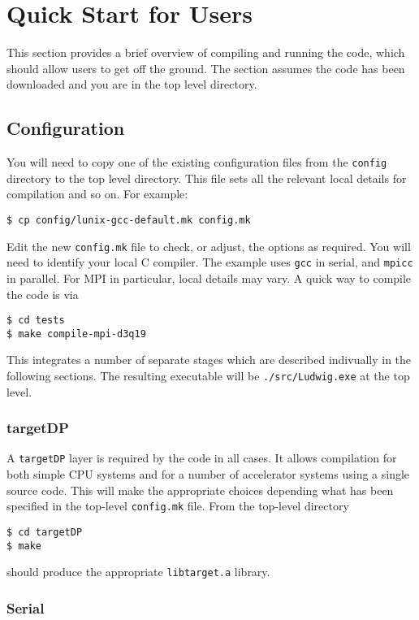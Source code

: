 \vfill
\pagebreak

\section{Quick Start for Users}

This section provides a brief overview of compiling and running
the code, which should allow users to get off the ground.
The section assumes the code has been downloaded and you are in the
top level directory.

\subsection{Configuration}

You will need to copy one of the existing configuration files from
the \texttt{config} directory to the top level directory. This file
sets all the relevant local details for compilation and so on. For
example:
\begin{lstlisting}
$ cp config/lunix-gcc-default.mk config.mk
\end{lstlisting}
Edit the new \texttt{config.mk} file to check, or adjust, the options
as required. You will need to identify your local C compiler. The
example uses \texttt{gcc}
in serial, and \texttt{mpicc} in parallel. For MPI in particular,
local details may vary. A quick way to compile the code is via
\begin{lstlisting}
$ cd tests
$ make compile-mpi-d3q19
\end{lstlisting}
This integrates a number of separate stages which are described
indivually in the following sections. The resulting executable
will be \texttt{./src/Ludwig.exe} at the top level.

\subsubsection{targetDP}

A \texttt{targetDP} layer is required by the code in all cases. It
allows compilation for both simple CPU systems and
for a number of accelerator systems using a single source code. This
will make the appropriate choices depending what has been specified
in the top-level \texttt{config.mk} file. From the top-level directory
\begin{lstlisting}
$ cd targetDP
$ make
\end{lstlisting}
should produce the appropriate \texttt{libtarget.a} library.

\subsubsection{Serial}
\label{section:quick-serial}

